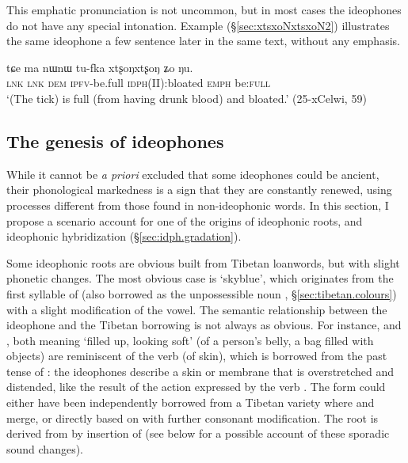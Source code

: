 This emphatic pronunciation is not uncommon, but in most cases the ideophones do not have any special intonation. Example (§\ref{sec:xtsxoNxtsxoN2}) illustrates the same ideophone  a few sentence later in the same text, without any emphasis.

\begin{exe}
\ex \label{sec:xtsxoNxtsxoN2}
\gll tɕe ma nɯnɯ tu-fka xtʂoŋxtʂoŋ ʑo ŋu. \\
\textsc{lnk} \textsc{lnk} \textsc{dem} \textsc{ipfv}-be.full \textsc{idph}(II):bloated \textsc{emph} be:\textsc{full} \\
\glt `(The tick) is full (from having drunk blood) and bloated.' (25-xCelwi, 59)
\end{exe}

\subsection{The genesis of ideophones} \label{sec:genesis.idph}
While it cannot be \textit{a priori} excluded that some ideophones could be ancient, their phonological markedness is a sign that they are constantly renewed, using processes different from those found in non-ideophonic words. In this section, I propose a scenario account for one of the origins of ideophonic roots, and  ideophonic hybridization (§\ref{sec:idph.gradation}).

Some ideophonic roots are obvious built from Tibetan loanwords, but with slight phonetic changes. The most obvious case is  `skyblue', which originates from the first syllable of  (also borrowed as the unpossessible noun , §\ref{sec:tibetan.colours}) with a slight modification of the vowel. The semantic relationship between the ideophone and the Tibetan borrowing is not always as obvious. For instance,  and , both meaning `filled up, looking soft' (of a person's belly, a bag filled with objects) are reminiscent of the verb  (of skin), which is borrowed from the past tense of : the ideophones describe a skin or membrane that is overstretched and distended, like the result of the action expressed by the verb . The form  could either have been independently borrowed from a Tibetan variety where  and  merge, or directly based on  with further consonant modification. The root  is derived from  by insertion of  (see below for a possible account of these sporadic sound changes).
 
